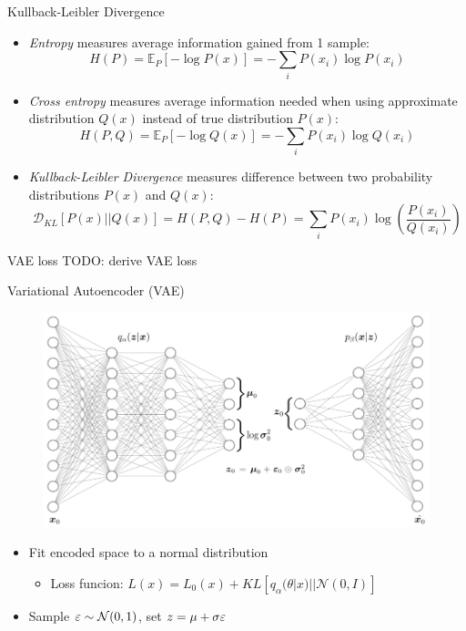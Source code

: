 \documentclass{beamer}
\def \e{\ensuremath \varepsilon}
\theoremstyle{definition}
\begin{document}
\begin{frame}{Kullback-Leibler Divergence}
\begin{itemize}
  \item<1-> \textit{Entropy} measures average information gained from 1 sample:
  \[H(P) = \mathbb{E}_P[-\log P(x)] =  - \sum_i P(x_i) \log P(x_i)\]
  \item<2-> \textit{Cross entropy} measures average information needed when using approximate distribution $Q(x)$ instead of true distribution $P(x)$:
  \[H(P,Q) = \mathbb{E}_P[-\log Q(x)] = -\sum_i P(x_i) \log Q(x_i)\]
  \item<3-> \textit{Kullback-Leibler Divergence} measures difference between two probability distributions $P(x)$ and $Q(x)$:
\[\mathcal{D}_{KL} \left[ P(x) || Q(x) \right] = H(P,Q) - H(P) = \sum_i P(x_i) \log \left(\frac{P(x_i)}{Q(x_i)} \right)\]
\end{itemize}
\end{frame}

\begin{frame}{VAE loss}
  TODO: derive VAE loss
\end{frame}

\begin{frame}{Variational Autoencoder (VAE)}
\begin{figure}
  \includegraphics[width=.7\textwidth]{../img/vae_visual.png}
\end{figure}
\begin{itemize}
  \item<1-> Fit encoded space to a normal distribution
  \begin{itemize}
    \item<1-> Loss funcion: $L(x) = L_0(x) + KL[q_\alpha(\theta | x) || \mathcal{N}(0,I)] $
  \end{itemize}
  \item<2-> Sample $\e \sim \mathcal{N}(0,1)$, set $z = \mu + \sigma \e$
\end{itemize}
\end{frame}
\end{document}
